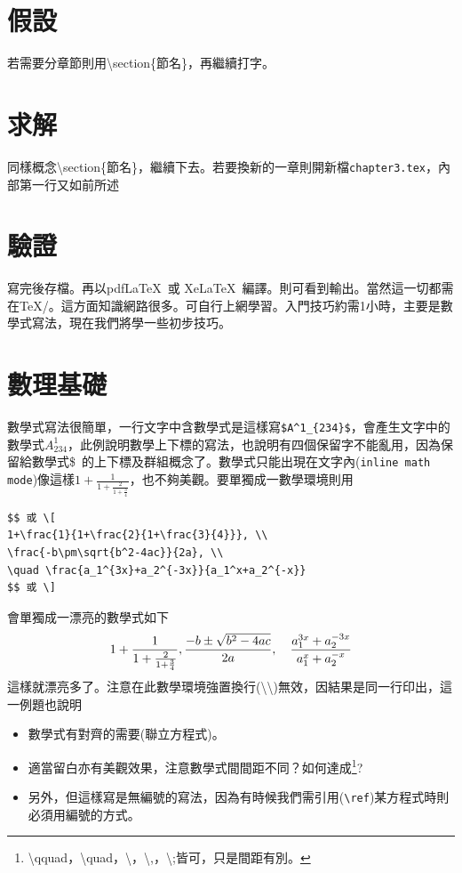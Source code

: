 \section{假設}
若需要分章節則用{\textbackslash section\{節名\}}，再繼續打字。
\section{求解}
同樣概念{\textbackslash section\{節名\}}，繼續下去。若要換新的一章則開新檔{\tt chapter3.tex}，內部第一行又如前所述

\section{驗證}
寫完後存檔。再以pdf\LaTeX\ 或 Xe\LaTeX\ 編譯。則可看到輸出。當然這一切都需在\TeX/。這方面知識網路很多。可自行上網學習。入門技巧約需1小時，主要是數學式寫法，現在我們將學一些初步技巧。
\section{數理基礎}
數學式寫法很簡單，一行文字中含數學式是這樣寫\verb|$A^1_{234}$|，會產生文字中的數學式$A^1_{234}$，此例說明數學上下標的寫法，也說明有四個保留字不能亂用，因為保留給數學式\$\ 的上下標及群組概念了。數學式只能出現在文字內({\tt inline math mode})像這樣$1+\frac{1}{1+\frac{2}{1+\frac{3}{4}}}$，也不夠美觀。要單獨成一數學環境則用\\
\begin{Verbatim}[frame=single,firstline=1,label=Form 1 w/o number]
$$ 或 \[
1+\frac{1}{1+\frac{2}{1+\frac{3}{4}}}, \\
\frac{-b\pm\sqrt{b^2-4ac}}{2a}, \\
\quad \frac{a_1^{3x}+a_2^{-3x}}{a_1^x+a_2^{-x}}
$$ 或 \]
\end{Verbatim}
會單獨成一漂亮的數學式如下  \index{\LaTeX 環境!\textbackslash [}\index{\LaTeX 環境!\textbackslash ]}
$$ 
1+\frac{1}{1+\frac{2}{1+\frac{3}{4}}}, \\
\frac{-b\pm\sqrt{b^2-4ac}}{2a},\\
\quad \frac{a_1^{3x}+a_2^{-3x}}{a_1^x+a_2^{-x}}
$$
這樣就漂亮多了。注意在此數學環境強置換行(\textbackslash \textbackslash)無效，因結果是同一行印出，這一例題也說明
\begin{itemize}
\item 數學式有對齊的需要(聯立方程式)。
\item 適當留白亦有美觀效果，注意數學式間間距不同？如何達成\footnote{\textbackslash qquad，\textbackslash quad，\textbackslash ，\textbackslash,，\textbackslash;皆可，只是間距有別。}?
\item 另外，但這樣寫是無編號的寫法，因為有時候我們需引用(\verb|\ref|)某方程式時則必須用編號的方式。
\end{itemize}
